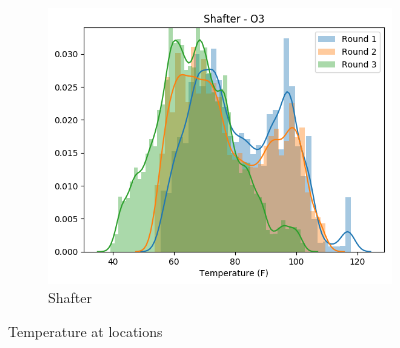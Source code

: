 \documentclass[journal abbreviation, manuscript]{copernicus}
\begin{document}
\begin{figure}[H]
\begin{subfigure}{0.32\textwidth}
\includegraphics[width=\textwidth]{results/distributions/location_shafter_temperature.png}
\caption{Shafter}
\end{subfigure}
\caption{Temperature at locations}
\label{fig:temperature-locations}
\end{figure}
\end{document}
